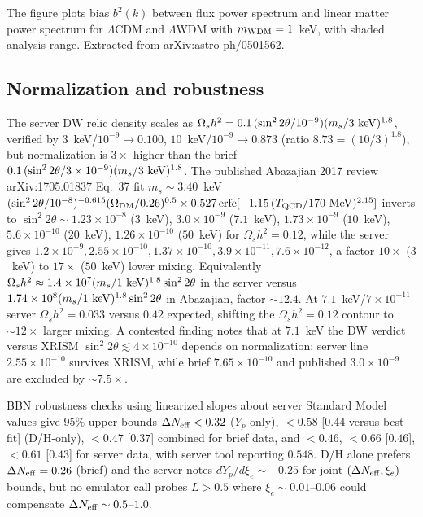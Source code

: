 \documentclass[11pt,a4paper]{article}
\begin{document}
The figure plots bias $b^{2}(k)$ between flux power spectrum and linear matter power spectrum for $\Lambda$CDM and $\Lambda$WDM with $m_{\rm WDM}=1$~keV, with shaded analysis range. Extracted from arXiv:astro-ph/0501562.

\subsection{Normalization and robustness}
The server DW relic density scales as $\Omega_{s}h^{2}=0.1\,(\sin^{2}2\theta/10^{-9})(m_{s}/3~{\rm keV})^{1.8}$, verified by $3$~keV/$10^{-9}\to0.100$, $10$~keV/$10^{-9}\to0.873$ (ratio $8.73=(10/3)^{1.8}$), but normalization is $3\times$ higher than the brief $0.1\,(\sin^{2}2\theta/3\times10^{-9})(m_{s}/3~{\rm keV})^{1.8}$. The published Abazajian 2017 review arXiv:1705.01837 Eq.~37 fit $m_{s}\sim3.40$~keV$(\sin^{2}2\theta/10^{-8})^{-0.615}(\Omega_{\rm DM}/0.26)^{0.5}\times0.527\,{\rm erfc}[-1.15\,(T_{\rm QCD}/170~{\rm MeV})^{2.15}]$ inverts to $\sin^{2}2\theta\sim1.23\times10^{-8}$ ($3$~keV), $3.0\times10^{-9}$ ($7.1$~keV), $1.73\times10^{-9}$ ($10$~keV), $5.6\times10^{-10}$ ($20$~keV), $1.26\times10^{-10}$ ($50$~keV) for $\Omega_{s}h^{2}=0.12$, while the server gives $1.2\times10^{-9},2.55\times10^{-10},1.37\times10^{-10},3.9\times10^{-11},7.6\times10^{-12}$, a factor $10\times$ ($3$~keV) to $17\times$ ($50$~keV) lower mixing. Equivalently $\Omega_{s}h^{2}\approx1.4\times10^{7}(m_{s}/1~{\rm keV})^{1.8}\sin^{2}2\theta$ in the server versus $1.74\times10^{8}(m_{s}/1~{\rm keV})^{1.8}\sin^{2}2\theta$ in Abazajian, factor $\sim12.4$. At $7.1$~keV/$7\times10^{-11}$ server $\Omega_{s}h^{2}=0.033$ versus $0.42$ expected, shifting the $\Omega_{s}h^{2}=0.12$ contour to $\sim12\times$ larger mixing. A contested finding notes that at $7.1$~keV the DW verdict versus XRISM $\sin^{2}2\theta\lesssim4\times10^{-10}$ depends on normalization: server line $2.55\times10^{-10}$ survives XRISM, while brief $7.65\times10^{-10}$ and published $3.0\times10^{-9}$ are excluded by $\sim7.5\times$.

BBN robustness checks using linearized slopes about server Standard Model values give 95\% upper bounds $\Delta N_{\rm eff}<0.32$ ($Y_{p}$-only), $<0.58$ [$0.44$ versus best fit] (D/H-only), $<0.47$ [$0.37$] combined for brief data, and $<0.46$, $<0.66$ [$0.46$], $<0.61$ [$0.43$] for server data, with server tool reporting $0.548$. D/H alone prefers $\Delta N_{\rm eff}=0.26$ (brief) and the server notes $dY_{p}/d\xi_{e}\sim-0.25$ for joint $(\Delta N_{\rm eff},\xi_{e})$ bounds, but no emulator call probes $L>0.5$ where $\xi_{e}\sim0.01$--$0.06$ could compensate $\Delta N_{\rm eff}\sim0.5$--$1.0$.
\end{document}

